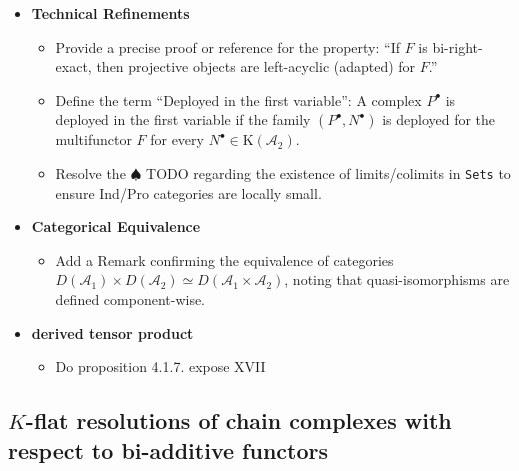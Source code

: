 {\begin{itemize}
    \item \textbf{Technical Refinements}
    \begin{itemize}
        \item Provide a precise proof or reference for the property: ``If $F$ is bi-right-exact, then projective objects are left-acyclic (adapted) for $F$.''
        \item Define the term ``Deployed in the first variable'': A complex $P^\bullet$ is deployed in the first variable if the family $(P^\bullet, N^\bullet)$ is deployed for the multifunctor $F$ for every $N^\bullet \in \text{K}(\mathcal{A}_2)$.
        \item Resolve the $\spadesuit$ TODO regarding the existence of limits/colimits in \texttt{Sets} to ensure Ind/Pro categories are locally small.
    \end{itemize}

    \item \textbf{Categorical Equivalence}
    \begin{itemize}
        \item Add a Remark confirming the equivalence of categories $D(\mathcal{A}_1) \times D(\mathcal{A}_2) \simeq D(\mathcal{A}_1 \times \mathcal{A}_2)$, noting that quasi-isomorphisms are defined component-wise.
    \end{itemize}

    \item \textbf{derived tensor product}
    \begin{itemize}
        \item Do proposition 4.1.7. expose XVII
    \end{itemize}
\end{itemize}
}


\subsection{$K$-flat resolutions of chain complexes with respect to bi-additive functors}













